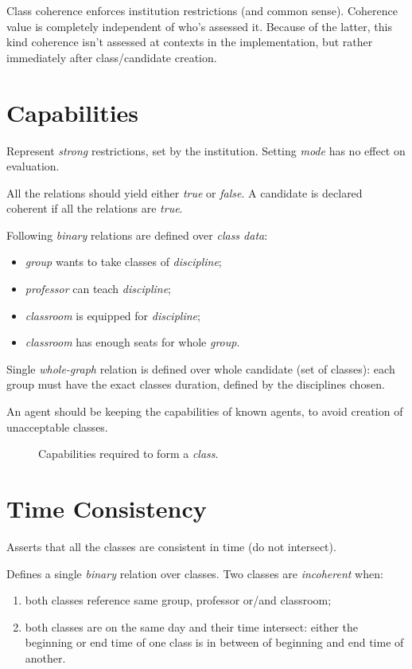 \documentclass[../ThesisDoc]{subfiles}
\begin{document}
\providecommand{\rootdir}{..}
\providecommand{\seccmd}[1]{\section{#1}}


Class coherence enforces institution restrictions (and common sense).
Coherence value is completely independent of who's assessed it.
Because of the latter, this kind coherence isn't assessed at contexts
in the implementation, but rather immediately after class/candidate creation.

\seccmd{Capabilities}

Represent \emph{strong} restrictions, set by the institution.
Setting \emph{mode} has no effect on evaluation.

All the relations should yield either \emph{true} or \emph{false}.
A candidate is declared coherent if all the relations are \emph{true}.

Following \emph{binary} relations are defined over \emph{class data}:
\begin{itemize}
  \item \emph{group} wants to take classes of \emph{discipline};
  \item \emph{professor} can teach \emph{discipline};
  \item \emph{classroom} is equipped for \emph{discipline};
  \item \emph{classroom} has enough seats for whole \emph{group}.
\end{itemize}

Single \emph{whole-graph} relation is defined over whole candidate (set of classes):
each group must have the exact classes duration, defined by the disciplines chosen.

An agent should be keeping the capabilities of known agents, to avoid creation
of unacceptable classes.

\begin{figure}[h]
  \centering
  
  \caption{Capabilities required to form a \emph{class}.}
  \label{fig:capabilities}
\end{figure}


\seccmd{Time Consistency}

Asserts that all the classes are consistent in time (do not intersect).

Defines a single \emph{binary} relation over classes.
Two classes are \emph{incoherent} when:
\begin{enumerate}
  \item both classes reference same group, professor or/and classroom;
  \item both classes are on the same day and their time intersect:
          either the beginning or end time of one class is in between of
          beginning and end time of another.
\end{enumerate}

\begin{center}
  
\end{center}
\end{document}
